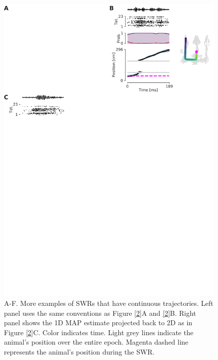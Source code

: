 \documentclass[times, twoside]{zHenriquesLab-StyleBioRxiv}
\begin{document}
\begin{figure}%
\centering
\includegraphics[width=0.80\linewidth]{figures/Figure2-supplemental2/Figure2_v4-supplemental2}
\caption{A-F. More examples of SWRs that have continuous trajectories. Left panel uses the same conventions as Figure \ref{2}A and \ref{2}B. Right panel shows the 1D MAP estimate projected back to 2D as in Figure \ref{2}C. Color indicates time. Light grey lines indicate the animal's position over the entire epoch. Magenta dashed line represents the animal's position during the SWR.}
\label{fig:Figure2-Figure supplement 2}
\end{figure}
\end{document}
